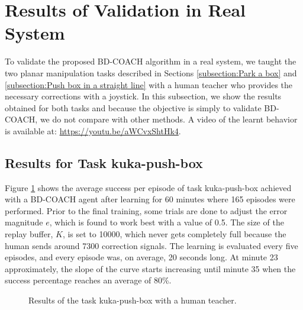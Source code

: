 




\section{Results of Validation in Real System}
\label{section:results_kuka}
To validate the proposed BD-COACH algorithm in a real system, we taught the two planar manipulation tasks described in Sections \ref{subsection:Park a box} and \ref{subsection:Push box in a straight line} with a human teacher who provides the necessary corrections with a joystick. In this subsection, we show the results obtained for both tasks and because the objective is simply to validate BD-COACH, we do not compare with other methods. A video of the learnt behavior is available at: \url{https://youtu.be/aWCvxShtHk4}.



\subsection{Results for Task kuka-push-box}
\label{subsection:results_kuka_push}


Figure \ref{fig:kukapush} shows the average success per episode of task kuka-push-box achieved with a BD-COACH agent after learning for 60 minutes where 165 episodes were performed. Prior to the final training, some trials are done to adjust the error magnitude $e$, which is found to work best with a value of 0.5. The size of the replay buffer, $K$, is set to 10000, which never gets completely full because the human sends around 7300 correction signals.
The learning is evaluated every five episodes, and every episode was, on average, 20 seconds long. At minute 23 approximately, the slope of the curve starts increasing until minute 35 when the success percentage reaches an average of 80\%.












 \begin{figure}[H]
  \centering

   \caption{Results of the task kuka-push-box with a human teacher.}
  \label{fig:kukapush}
\end{figure}


